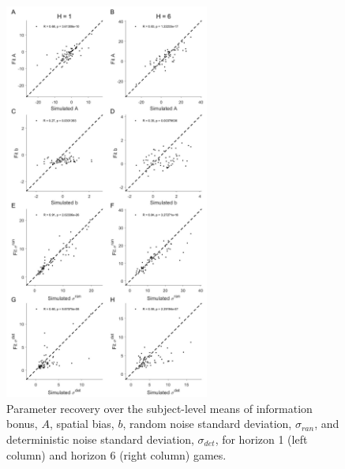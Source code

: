 \documentclass[12pt]{article}
\begin{document}
	\begin{figure}[hp]
		\begin{center}
			\includegraphics[width=0.6\textwidth]{figures/RDBayes_parameterrecovery_subject_examplesession.jpg}
			\caption{Parameter recovery over the subject-level means of information bonus, $A$, spatial bias, $b$, random noise standard deviation, $\sigma_{ran}$, and deterministic noise standard deviation, $\sigma_{det}$, for horizon 1 (left column) and horizon 6 (right column) games.}
			\label{fig:s5}
		\end{center}
	\end{figure} 
\newpage
\end{document}
